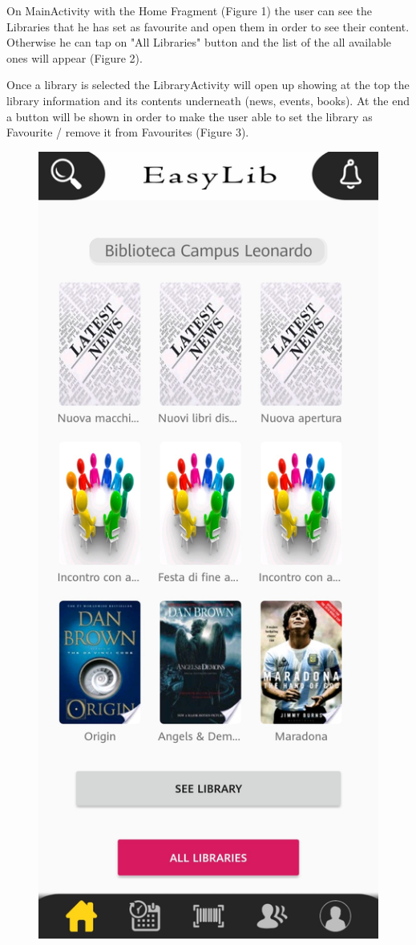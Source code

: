 \vspace{3mm}
On MainActivity with the Home Fragment (Figure 1) the user can see the Libraries that he has set as favourite and open them in order to see their content. Otherwise he can tap on "All Libraries" button and the list of the all available ones will appear (Figure 2).\par
Once a library is selected the LibraryActivity will open up showing at the top the library information and its contents underneath (news, events, books). At the end a button will be shown in order to make the user able to set the library as Favourite / remove it from Favourites (Figure 3).
\begin{figure}[H]
	\centering
	\includegraphics[scale=0.15]{Images/UI/Libraries/1}

\end{figure}
